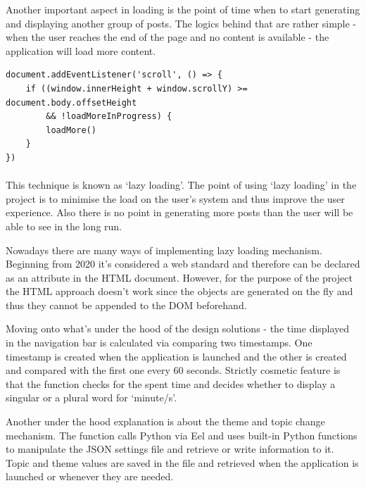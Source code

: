 \documentclass[12pt]{report}
\newenvironment{code}{\captionsetup{type=listing}}{}
\begin{document}
Another important aspect in loading is the point of time when to start generating and displaying another group of posts. The logics behind that are rather simple
- when the user reaches the end of the page and no content is available - the application will load more content.

\begin{code}
\begin{verbatim}
document.addEventListener('scroll', () => {
    if ((window.innerHeight + window.scrollY) >= document.body.offsetHeight
        && !loadMoreInProgress) {
        loadMore()
    }
})
\end{verbatim}
\end{code}

\paragraph*{}

This technique is known as `lazy loading'. The point of using `lazy loading' in the project is to minimise the load on the user's system
and thus improve the user experience. Also there is no point in generating more posts than the user will be able to see in the long run.

Nowadays there are many ways of implementing lazy loading mechanism. Beginning from 2020 it's considered a web standard and therefore
can be declared as an attribute in the HTML document. However, for the purpose of the project the HTML approach doesn't work since the objects
are generated on the fly and thus they cannot be appended to the DOM beforehand.

Moving onto what's under the hood of the design solutions - the time displayed in the navigation bar is calculated via comparing two timestamps.
One timestamp is created when the application is launched and the other is created and compared with the first one every 60 seconds.
Strictly cosmetic feature is that the function checks for the spent time and decides whether to display a singular or a plural word for `minute/s'.

Another under the hood explanation is about the theme and topic change mechanism. The function calls Python via Eel and uses built-in Python
functions to manipulate the JSON settings file and retrieve or write information to it. Topic and theme values are saved in the file and retrieved
when the application is launched or whenever they are needed.
\end{document}
